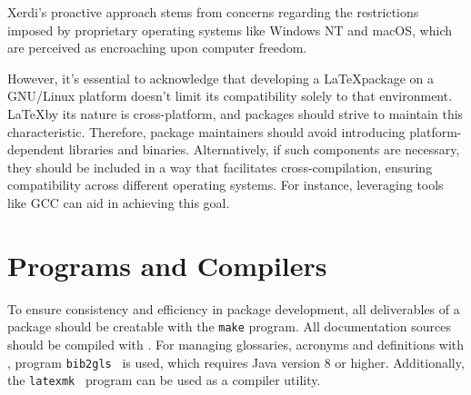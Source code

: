 \documentclass{xdpdoc}
\begin{document}
\begin{multicols}{2}
        \label{fig:updates}%

        Xerdi's proactive approach stems from concerns regarding the restrictions imposed by proprietary operating systems like Windows NT and macOS, which are perceived as encroaching upon computer freedom.

        However, it's essential to acknowledge that developing a \LaTeX package on a GNU/Linux platform doesn't limit its compatibility solely to that environment.
        \LaTeX by its nature is cross-platform, and packages should strive to maintain this characteristic.
        Therefore, package maintainers should avoid introducing platform-dependent libraries and binaries.
        Alternatively, if such components are necessary, they should be included in a way that facilitates cross-compilation, ensuring compatibility across different operating systems.
        For instance, leveraging tools like GCC can aid in achieving this goal.


        \section{Programs and Compilers}
        To ensure consistency and efficiency in package development, all deliverables of a package should be creatable with the \texttt{make} program.
        All documentation sources should be compiled with \LuaLaTeX.
        For managing glossaries, acronyms and definitions with \BibTeX, program \texttt{bib2gls}~\cite{bib2gls} is used, which requires Java version 8 or higher.
        Additionally, the \texttt{latexmk}~\cite{latexmk} program can be used as a compiler utility.



\end{multicols}
\end{document}

